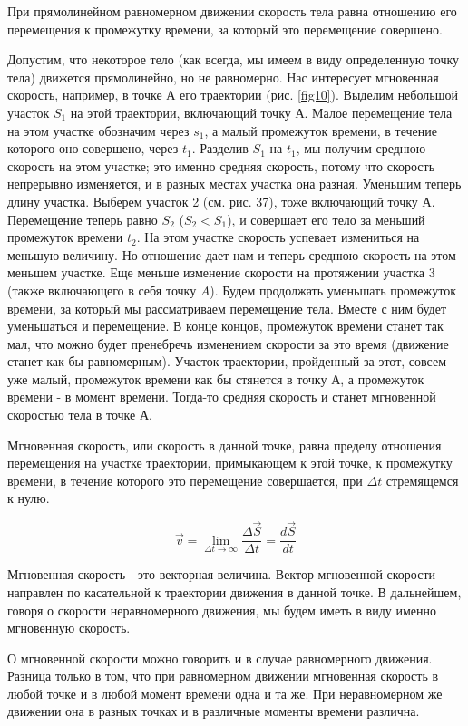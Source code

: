 \documentclass[a5paper, 10pt]{diss_4}
\renewcommand{\'}{\,'}
\begin{document}
  При прямолинейном равномерном движении скорость тела равна отношению
его перемещения к промежутку времени, за который это перемещение совершено.

  Допустим, что некоторое тело (как всегда, мы имеем в виду определенную
точку тела) движется прямолинейно, но не равномерно. Нас интересует мгновенная
 скорость, например, в точке $А$ его траектории (рис. \ref{fig10}). Выделим небольшой
участок $S_1$ на этой траектории, включающий точку $А$. Малое перемещение тела
на этом участке обозначим через $s_1$, а малый промежуток времени, в течение
которого оно совершено, через $t_1$. Разделив $S_1$ на $t_1$, мы получим
среднюю скорость на этом участке; это именно средняя скорость, потому что
скорость непрерывно изменяется, и в разных местах участка она разная.
Уменьшим теперь длину участка. Выберем участок 2 (см. рис. 37), тоже
включающий точку $А$. Перемещение теперь равно $S_2$ ($S_2<S_1$), и совершает
его тело за меньший промежуток времени $t_2$. На этом участке скорость
успевает измениться на меньшую величину. Но отношение дает нам и теперь
среднюю скорость на этом меньшем участке. Еще меньше изменение скорости на
протяжении участка 3 (также включающего в себя точку $A$). Будем продолжать
уменьшать промежуток времени, за который мы рассматриваем перемещение тела.
Вместе с ним будет уменьшаться и перемещение. В конце концов, промежуток
времени станет так мал, что можно будет пренебречь изменением скорости за это
время (движение станет как бы равномерным). Участок траектории, пройденный за
этот, совсем уже малый, промежуток времени как бы стянется в точку $А$, а
промежуток времени - в момент времени. Тогда-то средняя скорость и станет
мгновенной скоростью тела в точке $А$.

  Мгновенная скорость, или скорость в данной точке, равна пределу
отношения перемещения на участке траектории, примыкающем к этой точке, к
промежутку времени, в течение которого это перемещение совершается, при
$\Delta t$ стремящемся к нулю.

\[\vec{v}=\lim_{\Delta t\to\infty}\frac{\Delta\vec{S}}{\Delta t}=
\frac{d\vec{S}}{dt}
\]

  Мгновенная скорость - это векторная величина. Вектор мгновенной
скорости направлен по касательной к траектории движения в данной точке. В
дальнейшем, говоря о скорости неравномерного движения, мы будем иметь в виду
именно мгновенную скорость.

  О мгновенной скорости можно говорить и в случае равномерного движения.
Разница только в том, что при равномерном движении мгновенная скорость в любой
точке и в любой момент времени одна и та же. При неравномерном же движении она
в разных точках и в различные моменты времени различна.
\end{document}
